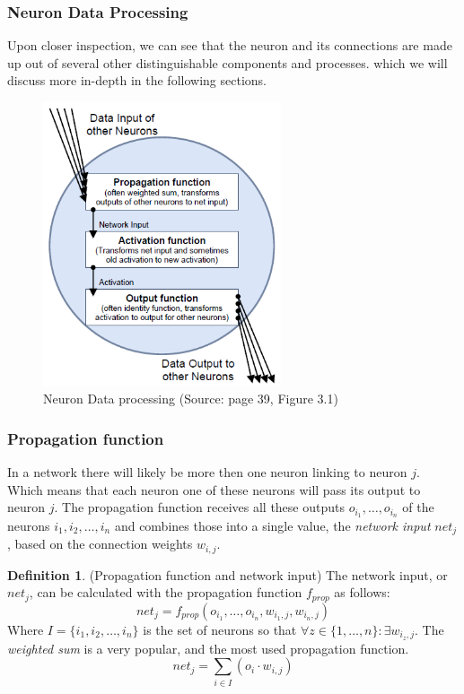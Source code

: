 \documentclass[pdftex,a4paper,12pt,twoside]{report}
\theoremstyle{plain} \newtheorem{theorem}{Theorem} \newtheorem{proposition}{Proposition} \newtheorem{lemma}{Lemma} \newtheorem*{corollary}{Corollary}
\theoremstyle{definition} \newtheorem{definition}{Definition} \newtheorem{conjecture}{Conjecture} \newtheorem*{example}{Example} \newtheorem{algorithm}{Algorithm}
\theoremstyle{remark} \newtheorem*{remark}{Remark} \newtheorem*{note}{Note} \newtheorem{case}{Case}
\begin{document}
\subsubsection{Neuron Data Processing}
Upon closer inspection, we can see that the neuron and its connections are made up out of several other distinguishable components and processes. which we will discuss more in-depth in the following sections.
\begin{figure}
\centering
\includegraphics[width=7cm]{./img/Neuron_Dataprocessing.png}
\caption{Neuron Data processing (Source: \citep{Kriesel2013} page 39, Figure 3.1)}
\end{figure}
\subsubsection{Propagation function}
In a network there will likely be more then one neuron linking to neuron $j$. Which means that each neuron one of these neurons will pass its output to neuron $j$. The propagation function receives all these outputs $o_{i_{1}},\dotsc,o_{i_{n}}$ of the neurons $i_1,i_2,\dotsc,i_n$ and combines those into a single value, the \emph{network input} $net_j$, based on the connection weights $w_{i,j}$.
\begin{definition}
(Propagation function and network input) The network input, or $net_j$, can be calculated with the propagation function $f _{prop}$ as follows:
\begin{equation}
net_j = f _{prop}(o_{i_{1}},\dotsc,o_{i_{n}},w_{i_{1},j},w_{i_{n},j})
\end{equation}
Where $I = \{i_1,i_2,\dotsc,i_n\}$ is the set of neurons so that $\forall z \in \{1,\dotsc,n\} : \exists w_{i_{z},j}$. The \emph{weighted sum} is a very popular, and the most used propagation function.
\begin{equation}
net_j = \sum_{i \in I}(o_i \cdot w_{i,j})
\end{equation}
\end{definition}
\end{document}
